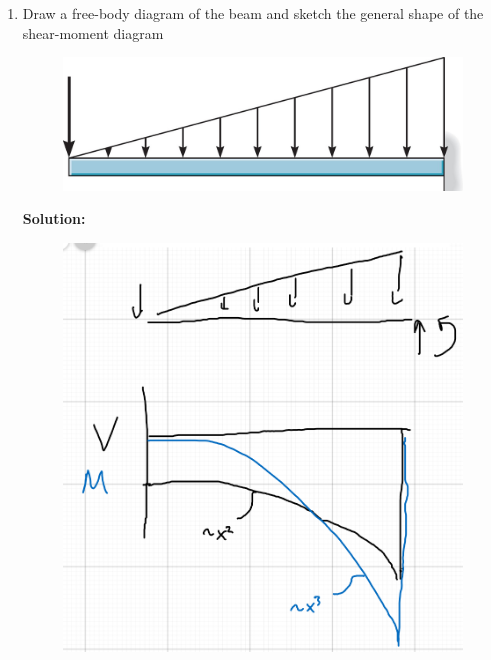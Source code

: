 \documentclass[12pt, oneside]{article}
\begin{document}
\begin{enumerate}
	\item %
		Draw a free-body diagram of the beam and sketch the general shape of the shear-moment diagram
		\begin{figure}[H]
			\centering
			\includegraphics[width=0.6\linewidth]{p6-1f}
		\end{figure}
		\textbf{Solution:}
		\begin{figure}[H]
			\centering
			\includegraphics[width=0.5\linewidth]{5-1}
		\end{figure}


\end{enumerate}
\end{document}
